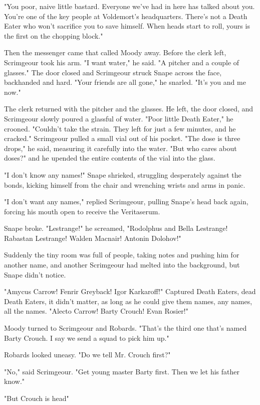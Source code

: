 "You poor, naive little bastard. Everyone we've had in here has talked about you. You're one of the key people at Voldemort's headquarters. There's not a Death Eater who won't sacrifice you to save himself. When heads start to roll, yours is the first on the chopping block."

Then the messenger came that called Moody away. Before the clerk left, Scrimgeour took his arm. "I want water," he said. "A pitcher and a couple of glasses." The door closed and Scrimgeour struck Snape across the face, backhanded and hard. "Your friends are all gone," he snarled. "It's you and me now."

The clerk returned with the pitcher and the glasses. He left, the door closed, and Scrimgeour slowly poured a glassful of water. "Poor little Death Eater," he crooned. "Couldn't take the strain. They left for just a few minutes, and he cracked." Scrimgeour pulled a small vial out of his pocket. "The dose is three drops," he said, measuring it carefully into the water. "But who cares about doses?" and he upended the entire contents of the vial into the glass.

"I don't know any names!" Snape shrieked, struggling desperately against the bonds, kicking himself from the chair and wrenching wrists and arms in panic.

"I don't want any names," replied Scrimgeour, pulling Snape's head back again, forcing his mouth open to receive the Veritaserum.

Snape broke. "Lestrange!" he screamed, "Rodolphus and Bella Lestrange! Rabastan Lestrange! Walden Macnair! Antonin Dolohov!"

Suddenly the tiny room was full of people, taking notes and pushing him for another name, and another{\el} Scrimgeour had melted into the background, but Snape didn't notice.

"Amycus Carrow! Fenrir Greyback! Igor Karkaroff!" Captured Death Eaters, dead Death Eaters, it didn't matter, as long as he could give them names, any names, all the names. "Alecto Carrow! Barty Crouch! Evan Rosier!"

Moody turned to Scrimgeour and Robards. "That's the third one that's named Barty Crouch. I say we send a squad to pick him up."

Robards looked uneasy. "Do we tell Mr. Crouch first?"

"No," said Scrimgeour. "Get young master Barty first. Then we let his father know."

"But Crouch is head{\el}"

